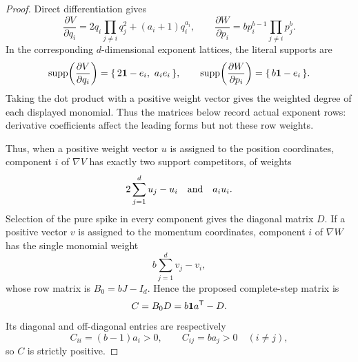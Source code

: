 \documentclass[11pt,letterpaper]{article}
\theoremstyle{plain}
\begin{document}
\begin{proof}
Direct differentiation gives
\[
\frac{\partial V}{\partial q_i}
=2q_i\prod_{j\ne i}q_j^2+(a_i+1)q_i^{a_i},
\qquad
\frac{\partial W}{\partial p_i}
=b p_i^{b-1}\prod_{j\ne i}p_j^b.
\]
In the corresponding $d$-dimensional exponent lattices, the literal supports are
\[
\operatorname{supp}\!\left(\frac{\partial V}{\partial q_i}\right)
=\{\,2\mathbf{1}-e_i,\ a_i e_i\,\},
\qquad
\operatorname{supp}\!\left(\frac{\partial W}{\partial p_i}\right)
=\{\,b\mathbf{1}-e_i\,\}.
\]
Taking the dot product with a positive weight vector gives the weighted degree of each displayed monomial.  Thus the matrices below record actual exponent rows: derivative coefficients affect the leading forms but not these row weights.

Thus, when a positive weight vector $u$ is assigned to the position coordinates, component $i$ of $\nabla V$ has exactly two support competitors, of weights
\[
2\sum_{j=1}^d u_j-u_i
\quad\hbox{and}\quad a_i u_i.
\]
Selection of the pure spike in every component gives the diagonal matrix $D$.  If a positive vector $v$ is assigned to the momentum coordinates, component $i$ of $\nabla W$ has the single monomial weight
\[
b\sum_{j=1}^d v_j-v_i,
\]
whose row matrix is $B_0=bJ-I_d$.  Hence the proposed complete-step matrix is
\[
C=B_0D=b\mathbf{1} a^{\mathsf{T}}-D.
\]
Its diagonal and off-diagonal entries are respectively
\[
C_{ii}=(b-1)a_i>0,\qquad C_{ij}=ba_j>0\quad(i\ne j),
\]
so $C$ is strictly positive.


\end{proof}
\end{document}
